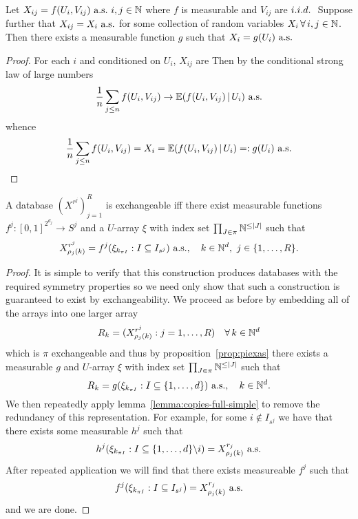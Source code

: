 \begin{lemma}
  \label{lemma:copies-full-simple}
  Let $X_{ij} = f({U}_i, {V}_{ij}) \ \textrm{a.s.} \ i,j \in \mathbb{N}$ where $f$ is measurable and ${V}_{ij}$ are $i.i.d.\ $
  Suppose further that $X_{ij} = X_i \ \textrm{a.s.}$ for some collection of random variables $X_{i} \, \forall \, i,j \in \mathbb{N}$.
  Then there exists a measurable function $g$ such that $X_i = g({U}_i) \ \textrm{a.s.}$
\end{lemma}

\begin{proof}
  For each $i$ and conditioned on $U_i$, ${X}_{ij}$ are \iid
  Then by the conditional strong law of large numbers
  \[
    \frac{1}{n}\sum_{j \leq n} f(U_i, V_{ij}) \to \mathbb{E}(f(U_i, V_{ij})\,|\, U_i) \,\, \textrm{a.s.}
  \]
  whence
  \[
    \frac{1}{n}\sum_{j \leq n} f(U_i, V_{ij}) = X_i = \mathbb{E}(f(U_i, V_{ij})\,|\, U_i) =: g(U_i) \,\, \textrm{a.s.}
  \]
\end{proof}

\begin{thm}
  \label{thm:as-database}
  A database $(X^{r^j})_{j=1}^R$ is exchangeable iff there exist measurable functions $f^j : [0,1]^{2^{d_j}} \to S^j$ and a $U$-array $\xi$ with index set $\prod_{J\in\pi} \mathbb{N}^{\leq |J|}$ such that
  \begin{equation}
    X_{\rho_j(k)}^{r^j} = f^j(\xi_{k_{\pi I}} : I \subseteq I_{s^j}) \ \textrm{a.s.}, \quad k \in \mathbb{N}^d, \ j \in \{1,\ldots,R\}.
  \end{equation}
\end{thm}

\begin{proof}
  It is simple to verify that this construction produces databases with the required symmetry properties so we need only show that such a construction is guaranteed to exist by exchangeability.
  We proceed as before by embedding all of the arrays into one larger array
  \[
    R_{k} = (X^{r^j}_{\rho_j(k)} : j = 1,\dots,R) \quad \forall \, k \in \mathbb{N}^d
  \]
  which is $\pi$ exchangeable and thus by proposition~\ref{prop:piexas} there exists a measurable $g$ and $U$-array $\xi$ with index set $\prod_{J\in\pi} \mathbb{N}^{\leq |J|}$ such that
  \[
    R_{k} = g(\xi_{k_{\pi I}} : I \subseteq \{1,\ldots,d\}) \ \textrm{a.s.}, \quad k \in \mathbb{N}^d.
  \]
  We then repeatedly apply lemma~\ref{lemma:copies-full-simple} to remove the redundancy of this representation.
  For example, for some $i \notin I_{s^j}$ we have that there exists some measurable $h^j$ such that
  \[
    h^j(\xi_{k_{\pi I}} : I \subseteq \{1,\ldots,d\} \backslash i) = X^{r_j}_{\rho_j(k)} \ \textrm{a.s.}
  \]
  After repeated application we will find that there exists measureable $f^j$ such that
  \[
    f^j(\xi_{k_{\pi I}} : I \subseteq I_{s^j}) = X^{r_j}_{\rho_j(k)} \ \textrm{a.s.}
  \]
  and we are done.
\end{proof}

